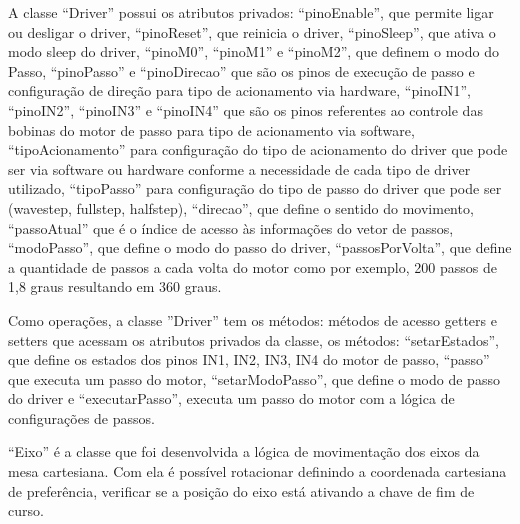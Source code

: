 
A classe “Driver” possui os atributos privados: “pinoEnable”, que permite ligar ou desligar o driver, 
“pinoReset”, que reinicia o driver, “pinoSleep”, que ativa o modo sleep do driver, “pinoM0”, “pinoM1” 
e “pinoM2”, que definem o modo do Passo, “pinoPasso” e “pinoDirecao” que são os pinos de execução de 
passo e configuração de direção para tipo de acionamento via hardware, “pinoIN1”, “pinoIN2”, “pinoIN3” 
e “pinoIN4” que são os pinos referentes ao controle das bobinas do motor de passo para tipo de acionamento 
via software, “tipoAcionamento” para configuração do tipo de acionamento do driver que pode ser via software 
ou hardware conforme a necessidade de cada tipo de driver utilizado, “tipoPasso” para configuração do tipo 
de passo do driver que pode ser (wavestep, fullstep, halfstep), “direcao”, que define o sentido do movimento, 
“passoAtual” que é o índice de acesso às informações do vetor de passos, “modoPasso”, que define o modo do 
passo do driver, “passosPorVolta”, que define a quantidade de passos a cada volta do motor como por exemplo, 
200 passos de 1,8 graus resultando em 360 graus. 

Como operações, a classe ”Driver” tem os métodos: métodos de acesso getters e setters que acessam os 
atributos privados da classe, os métodos: “setarEstados”, que define os estados dos pinos IN1, IN2, IN3, 
IN4 do motor de passo, “passo” que executa um passo do motor, “setarModoPasso”, que define o modo de passo 
do driver e “executarPasso”, executa um passo do motor com a lógica de configurações de passos.

“Eixo” é a classe que foi desenvolvida a lógica de movimentação dos eixos da mesa cartesiana. Com ela é 
possível rotacionar definindo a coordenada cartesiana de preferência, verificar se a posição do eixo 
está ativando a chave de fim de curso.

